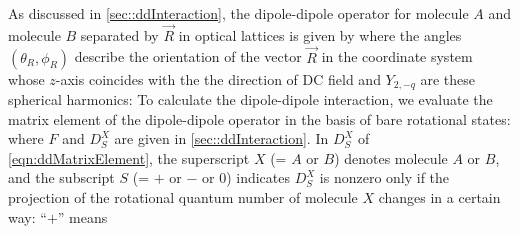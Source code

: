 As discussed in \autoref{sec::ddInteraction}, the dipole-dipole operator for molecule $A$ and molecule $B$ separated by 
$\vec{R}$ in optical lattices is given by
where the angles $(\theta_{R}, \phi_{R})$ describe the orientation of the vector  $\vec{R}$ in the coordinate
 system whose $z$-axis coincides with the the direction of DC field and $Y_{2, -q}$ are these spherical harmonics:
To calculate the dipole-dipole interaction, we evaluate the matrix element of the dipole-dipole operator in the basis
of bare rotational states:
where $F$ and $D_{S}^{X}$ are given in \autoref{sec::ddInteraction}. In $D_{S}^X$ of \autoref{eqn:ddMatrixElement},  
the superscript $X$  (= $A$ or $B$) denotes molecule $A$ or $B$, and the subscript 
$S$ (= $+$ or $-$ or $0$) indicates $D_{S}^X$ is nonzero only if 
the projection of the rotational quantum number of molecule $X$ changes in a certain way: 
``$+$'' means  
